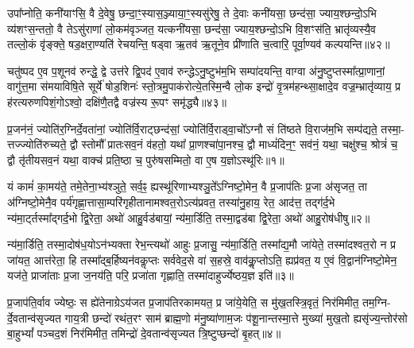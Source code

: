 उपा᳚प्नोति॒ कनी॑याꣳसि॒ वै दे॒वेषु॒ छन्दा॒ꣳ॒स्यास॒ञ्ज्याया॒ꣳ॒स्यसु॑रेषु॒ ते दे॒वाः कनी॑यसा॒ छन्द॑सा॒ ज्याय॒श्छन्दो॒\-ऽभि व्य॑शꣳस॒न्ततो॒ वै ते\-ऽसु॑राणां लो॒कम॑वृञ्जत॒ यत्कनी॑यसा॒ छन्द॑सा॒ ज्याय॒श्छन्दो॒\-ऽभि वि॒शꣳस॑ति॒ भ्रातृ॑व्यस्यै॒व तल्लो॒कं वृ॑ङ्क्ते॒ षड॒क्षरा॒ण्यति॑ रेचयन्ति॒ षड्वा ऋ॒तव॑ ऋ॒तूने॒व प्री॑णाति च॒त्वारि॒ पूर्वा॒ण्यव॑ कल्पयन्ति॥४२॥

चतु॑ष्पद ए॒व प॒शूनव॑ रुन्द्धे॒ द्वे उत्त॑रे द्वि॒पद॑ ए॒वाव॑ रुन्द्धे\-ऽनु॒ष्टुभ॑म॒भि सम्पा॑दयन्ति॒ वाग्वा अ॑नु॒ष्टुप्तस्मा᳚त्प्रा॒णानां॒ वागु॑त्त॒मा स॑मयाविषि॒ते सूर्ये॑ षोड॒शिनः॑ स्तो॒त्रमु॒पाक॑रोत्ये॒तस्मि॒न्वै लो॒क इन्द्रो॑ वृ॒त्रम॑हन्थ्सा॒क्षादे॒व वज्र॒म्भ्रातृ॑व्याय॒ प्र ह॑रत्यरुणपिशं॒गो\-ऽश्वो॒ दक्षि॑णै॒तद्वै वज्र॑स्य रू॒पꣳ समृ॑द्ध्यै॥४३॥


{}


\setcounter{anuvakam}{0}
प्र॒जन॑नं॒ ज्योति॑र॒ग्निर्दे॒वता॑नां॒ ज्योति॑र्वि॒राट्छन्द॑सां॒ ज्योति॑र्वि॒राड्वा॒चो᳚\-ऽग्नौ सं ति॑ष्ठते वि॒राज॑म॒भि सम्प॑द्यते॒ तस्मा॒- त्तज्ज्योति॑रुच्यते॒ द्वौ स्तोमौ᳚ प्रातःसव॒नं व॑हतो॒ यथा᳚ प्रा॒णश्चा॑पा॒नश्च॒ द्वौ माध्यं॑दिन॒ꣳ॒ सव॑नं॒ यथा॒ चक्षु॑श्च॒ श्रोत्रं॑ च॒ द्वौ तृ॑तीयसव॒नं यथा॒ वाक्च॑ प्रति॒ष्ठा च॒ पुरु॑षसम्मितो॒ वा ए॒ष य॒ज्ञो\-ऽस्थू॑रिः॥१॥

यं कामं॑ का॒मय॑ते॒ तमे॒तेना॒भ्य॑श्ञुते॒ सर्व॒ꣴ॒ ह्यस्थू॑रिणाभ्यश्ञु॒ते᳚\-ऽग्निष्टो॒मेन॒ वै प्र॒जाप॑तिः प्र॒जा अ॑सृजत॒ ता अ॑ग्निष्टो॒मेनै॒व पर्य॑गृह्णा॒त्तासा॒म्परि॑गृहीतानामश्वत॒रो\-ऽत्य॑प्रवत॒ तस्या॑नु॒हाय॒ रेत॒ आद॑त्त॒ तद्ग॑र्द॒भे न्य॑मा॒र्ट्तस्मा᳚द्गर्द॒भो द्वि॒रेता॒ अथो॑ आहु॒र्वड॑बायां॒ न्य॑मा॒र्डिति॒ तस्मा॒द्वड॑बा द्वि॒रेता॒ अथो॑ आहु॒रोष॑धीषु॥२॥

न्य॑मा॒र्डिति॒ तस्मा॒दोष॑ध॒यो\-ऽन॑भ्यक्ता रेभ॒न्त्यथो॑ आहुः प्र॒जासु॒ न्य॑मा॒र्डिति॒ तस्मा᳚द्य॒मौ जा॑येते॒ तस्मा॑दश्वत॒रो न प्र जा॑यत॒ आत्त॑रेता॒ हि तस्मा᳚द्ब॒र्\mbox{}हिष्यन॑वकॢप्तः सर्ववेद॒से वा॑ स॒हस्रे॒ वाव॑कॢ॒प्तो\-ऽति॒ ह्यप्र॑वत॒ य ए॒वं वि॒द्वान॑ग्निष्टो॒मेन॒ यज॑ते॒ प्राजा॑ताः प्र॒जा ज॒नय॑ति॒ परि॒ प्रजा॑ता गृह्णाति॒ तस्मा॑दाहुर्ज्येष्ठय॒ज्ञ इति॑॥३॥

प्र॒जाप॑ति॒र्वाव ज्येष्ठः॒ स ह्ये॑तेनाग्रे\-ऽय॑जत प्र॒जाप॑तिरकामयत॒ प्र जा॑ये॒येति॒ स मु॑ख॒तस्त्रि॒वृतं॒ निर॑मिमीत॒ तम॒ग्नि- र्दे॒वतान्व॑सृज्यत गाय॒त्री छन्दो॑ रथंत॒रꣳ साम॑ ब्राह्म॒णो म॑नु॒ष्या॑णाम॒जः प॑शू॒नान्तस्मा॒त्ते मुख्या॑ मुख॒तो ह्यसृ॑ज्य॒न्तोर॑सो बा॒हु\-भ्यां᳚ पञ्चद॒शं निर॑मिमीत॒ तमिन्द्रो॑ दे॒वतान्व॑सृज्यत त्रि॒ष्टुप्छन्दो॑ बृ॒हत्॥४॥

